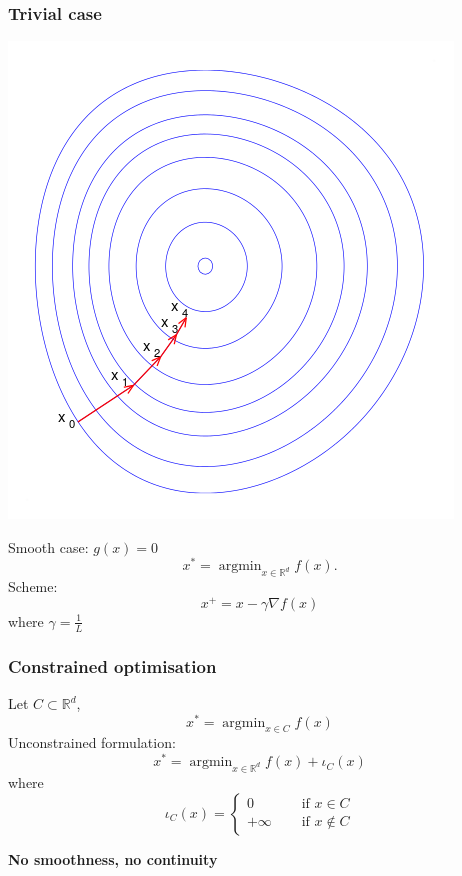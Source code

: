 \documentclass{beamer}
\newcommand{\rd}{\mathbb{R}^d}
\DeclareMathOperator*{\argmin}{argmin}
\begin{document}
		\begin{frame}
			\frametitle{Trivial case}
			\begin{minipage}{.45\textwidth}
			\includegraphics[width=\textwidth]{img/gradientdescent}
			\end{minipage}\qquad
			\begin{minipage}{.45\textwidth}
			Smooth case: $g(x) = 0$
			\begin{equation}\nonumber
			x^*=\argmin_{x\in\rd}f(x).
			\end{equation}
			Scheme:
			\begin{equation}
			\nonumber
			x^+ = x - \gamma\nabla f(x)
			\end{equation}
			where $\gamma=\frac{1}{L}$
			\end{minipage}
		\end{frame}

		\begin{frame}
		\frametitle{Constrained optimisation}
		Let $C\subset\rd$,
		\begin{equation}
		\nonumber
		x^*=\argmin_{x\in C}f(x)
		\end{equation}
		\pause
		Unconstrained formulation:
		\begin{equation}
		\nonumber
		x^*=\argmin_{x\in\rd}f(x) + \iota_C(x)
		\end{equation}
		where
		\begin{equation}
		\nonumber
		\iota_C(x) = \begin{cases}
		0 \quad &\text{ if } x\in C\\
		+\infty \quad &\text{ if } x\notin C
		\end{cases}
		\end{equation}
		
		\pause
		\begin{center}
		\textbf{No smoothness, no continuity}
		\end{center}
		\end{frame}
\end{document}
